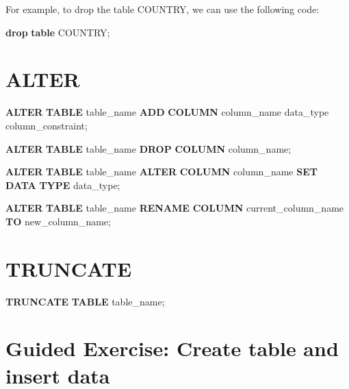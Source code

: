 \documentclass[
]{book}
\newenvironment{Shaded}{\begin{snugshade}}{\end{snugshade}}
\newcommand{\KeywordTok}[1]{\textcolor[rgb]{0.13,0.29,0.53}{\textbf{#1}}}
\newcommand{\NormalTok}[1]{#1}
\begin{document}
For example, to drop the table COUNTRY, we can use the following code:

\begin{Shaded}
\begin{Highlighting}[]
\KeywordTok{drop} \KeywordTok{table}\NormalTok{ COUNTRY;}
\end{Highlighting}
\end{Shaded}

\hypertarget{alter}{%
\section{ALTER}\label{alter}}

\begin{Shaded}
\begin{Highlighting}[]
\KeywordTok{ALTER} \KeywordTok{TABLE}\NormalTok{ table\_name}
\KeywordTok{ADD} \KeywordTok{COLUMN}\NormalTok{ column\_name data\_type column\_constraint;}

\KeywordTok{ALTER} \KeywordTok{TABLE}\NormalTok{ table\_name}
\KeywordTok{DROP} \KeywordTok{COLUMN}\NormalTok{ column\_name;}

\KeywordTok{ALTER} \KeywordTok{TABLE}\NormalTok{ table\_name}
\KeywordTok{ALTER} \KeywordTok{COLUMN}\NormalTok{ column\_name }\KeywordTok{SET} \KeywordTok{DATA} \KeywordTok{TYPE}\NormalTok{ data\_type;}

\KeywordTok{ALTER} \KeywordTok{TABLE}\NormalTok{ table\_name}
\KeywordTok{RENAME} \KeywordTok{COLUMN}\NormalTok{ current\_column\_name }\KeywordTok{TO}\NormalTok{ new\_column\_name;}
\end{Highlighting}
\end{Shaded}

\hypertarget{truncate}{%
\section{TRUNCATE}\label{truncate}}

\begin{Shaded}
\begin{Highlighting}[]
\KeywordTok{TRUNCATE} \KeywordTok{TABLE}\NormalTok{ table\_name;}
\end{Highlighting}
\end{Shaded}

\hypertarget{guided-exercise-create-table-and-insert-data}{%
\section{Guided Exercise: Create table and insert data}\label{guided-exercise-create-table-and-insert-data}}
\end{document}
